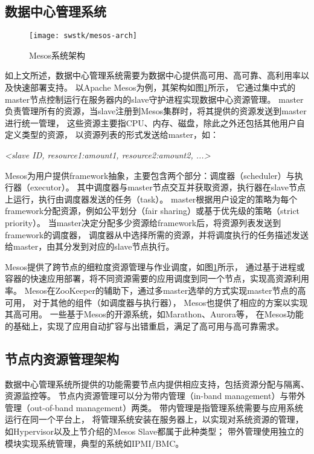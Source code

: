 \subsection{数据中心管理系统}

\begin{figure}[tb]
  \centering
  \texttt{[image: swstk/mesos-arch]}
  \caption{Mesos系统架构}
  \label{fig:mesos-arch}
\end{figure}

如上文所述，数据中心管理系统需要为数据中心提供高可用、高可靠、高利用率以及快速部署支持。
以Apache Mesos\cite{Hindman:2011:Mesos}为例，其架构如图\ref{fig:mesos-arch}所示，
它通过集中式的master节点控制运行在服务器内的slave守护进程实现数据中心资源管理。
master负责管理所有的资源，当slave注册到Mesos集群时，将其提供的资源发送到master进行统一管理，
这些资源主要指CPU、内存、磁盘，除此之外还包括其他用户自定义类型的资源，
以资源列表的形式发送给master，如：

\textit{<slave ID, resource1:amount1, resource2:amount2, ...>}

Mesos为用户提供framework抽象，主要包含两个部分：调度器（scheduler）与执行器（executor）。
其中调度器与master节点交互并获取资源，执行器在slave节点上运行，执行由调度器发送的任务（task）。
master根据用户设定的策略为每个framework分配资源，例如公平划分（fair sharing）或基于优先级的策略（strict priority）。
当master决定分配多少资源给framework后，将资源列表发送到framework的调度器，
调度器从中选择所需的资源，并将调度执行的任务描述发送给master，由其分发到对应的slave节点执行。

Mesos提供了跨节点的细粒度资源管理与作业调度，如图\ref{fig:mesos-arch}所示，
通过基于进程或容器的快速应用部署，将不同资源需要的应用调度到同一个节点，实现高资源利用率。
Mesos在ZooKeeper的辅助下，通过多master选举的方式实现master节点的高可用，
对于其他的组件（如调度器与执行器），
Mesos也提供了相应的方案以实现其高可用\cite{mesos-high-available-framework}。
一些基于Mesos的开源系统，如Marathon\cite{marathon}、Aurora\cite{Aurora}等，
在Mesos功能的基础上，实现了应用自动扩容与出错重启，满足了高可用与高可靠需求。


\subsection{节点内资源管理架构}

数据中心管理系统所提供的功能需要节点内提供相应支持，包括资源分配与隔离、资源监控等。
节点内资源管理可以分为带内管理（in-band management）与带外管理（out-of-band management）两类。
带内管理是指管理系统需要与应用系统运行在同一个平台上，
将管理系统安装在服务器上，以实现对系统资源的管理，
如Hypervisor以及上节介绍的Mesos Slave都属于此种类型；
带外管理使用独立的模块实现系统管理，典型的系统如IPMI/BMC。

